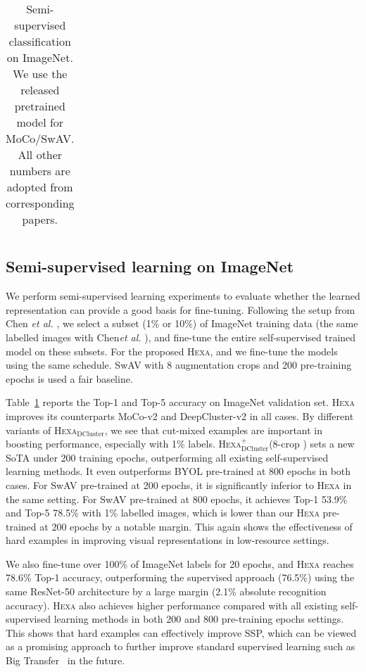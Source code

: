 \documentclass[10pt,twocolumn,letterpaper]{article}
\newcommand{\ea}[0]{\emph{et al. }}
\newcommand{\shortname}{\textsc{Hexa}}
\begin{document}
\begin{table}[t!]
\begin{tabular}{@{}lp{18pt}|p{18pt}@{}p{18pt}@{}|p{18pt}@{}p{18pt}|p{18pt}@{}p{18pt}}
  
\bottomrule
\end{tabular}

\vspace{-1mm}
\caption{Semi-supervised classification on ImageNet. We use the released pretrained model
for MoCo/SwAV. All other numbers are adopted from corresponding papers.}
\label{tab:semisup}
\vspace{-4mm}
\end{table}




\subsection{Semi-supervised learning on ImageNet}

We perform semi-supervised learning experiments to evaluate whether the learned representation can provide a good basis for fine-tuning. Following the setup from Chen \ea\cite{chen2020simple}, we select a subset (1\% or 10\%) of ImageNet training data (the same labelled images with Chen\ea\cite{chen2020simple}),
and fine-tune the entire self-supervised trained model on these subsets.
For the proposed \shortname{}, and  we fine-tune the models using the same schedule. SwAV with 8 augmentation crops and 200 pre-training epochs is used a fair baseline.

Table~\ref{tab:semisup} reports the Top-1 and Top-5 accuracy on ImageNet validation set. \shortname{} improves its counterparts MoCo-v2 and DeepCluster-v2 in all cases. By different variants of  \shortname{}$_{\text{DCluster}}$, we see that cut-mixed examples are important in boosting performance, especially with 1\% labels. 
\shortname{}$_{\text{DCluster}}^{+}$(8-crop \!) sets a new SoTA under 200 training epochs, outperforming all existing self-supervised learning methods. 
It even outperforms BYOL pre-trained at 800 epochs in both cases.
For SwAV pre-trained at 200 epochs, it is significantly inferior to \shortname{} in the same setting.
For SwAV pre-trained at 800 epochs, it achieves Top-1 53.9\% and Top-5 78.5\% with 1\% labelled images, which is lower than our \shortname{} pre-trained at 200 epochs by a notable margin. This again shows the effectiveness of hard examples in improving visual representations in low-resource settings. 

We also fine-tune over 100\% of ImageNet labels for 20 epochs, and \shortname{} reaches 78.6\% Top-1 accuracy, outperforming the supervised approach (76.5\%) using the same ResNet-50 architecture by a large margin (2.1\% absolute recognition accuracy). \shortname{} also achieves higher performance compared with all existing self-supervised learning methods in both 200 and 800 pre-training epochs settings. This shows that hard examples can effectively improve SSP, which can be viewed as a promising approach to further improve standard supervised learning such as Big Transfer~\cite{kolesnikov2019big} in the future.
\end{document}
